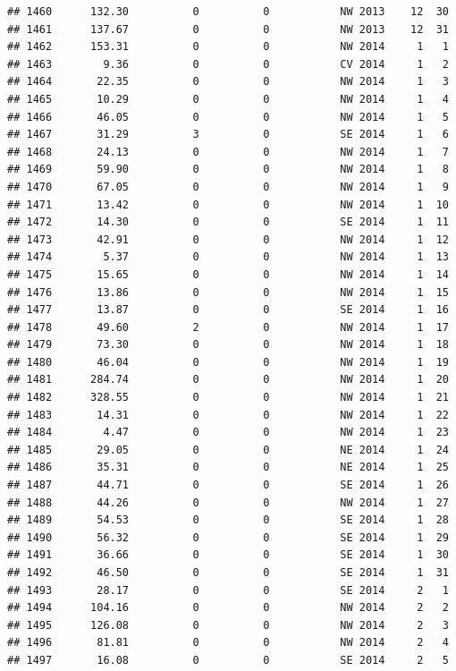 \documentclass[
]{article}
\begin{document}
\begin{verbatim}
## 1460      132.30          0          0           NW 2013    12  30
## 1461      137.67          0          0           NW 2013    12  31
## 1462      153.31          0          0           NW 2014     1   1
## 1463        9.36          0          0           CV 2014     1   2
## 1464       22.35          0          0           NW 2014     1   3
## 1465       10.29          0          0           NW 2014     1   4
## 1466       46.05          0          0           NW 2014     1   5
## 1467       31.29          3          0           SE 2014     1   6
## 1468       24.13          0          0           NW 2014     1   7
## 1469       59.90          0          0           NW 2014     1   8
## 1470       67.05          0          0           NW 2014     1   9
## 1471       13.42          0          0           NW 2014     1  10
## 1472       14.30          0          0           SE 2014     1  11
## 1473       42.91          0          0           NW 2014     1  12
## 1474        5.37          0          0           NW 2014     1  13
## 1475       15.65          0          0           NW 2014     1  14
## 1476       13.86          0          0           NW 2014     1  15
## 1477       13.87          0          0           SE 2014     1  16
## 1478       49.60          2          0           NW 2014     1  17
## 1479       73.30          0          0           NW 2014     1  18
## 1480       46.04          0          0           NW 2014     1  19
## 1481      284.74          0          0           NW 2014     1  20
## 1482      328.55          0          0           NW 2014     1  21
## 1483       14.31          0          0           NW 2014     1  22
## 1484        4.47          0          0           NW 2014     1  23
## 1485       29.05          0          0           NE 2014     1  24
## 1486       35.31          0          0           NE 2014     1  25
## 1487       44.71          0          0           SE 2014     1  26
## 1488       44.26          0          0           NW 2014     1  27
## 1489       54.53          0          0           SE 2014     1  28
## 1490       56.32          0          0           SE 2014     1  29
## 1491       36.66          0          0           SE 2014     1  30
## 1492       46.50          0          0           SE 2014     1  31
## 1493       28.17          0          0           SE 2014     2   1
## 1494      104.16          0          0           NW 2014     2   2
## 1495      126.08          0          0           NW 2014     2   3
## 1496       81.81          0          0           NW 2014     2   4
## 1497       16.08          0          0           SE 2014     2   5

\end{verbatim}
\end{document}
